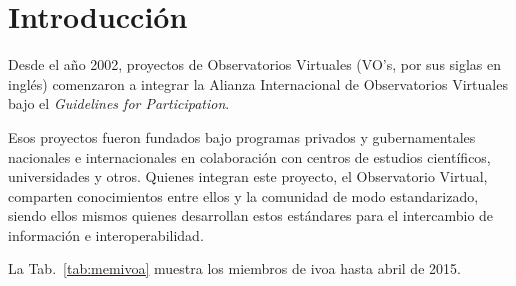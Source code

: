 \section*{Introducción}

Desde el año 2002, proyectos de Observatorios Virtuales (VO’s, por sus siglas en ingl\'es) comenzaron a integrar la Alianza Internacional de Observatorios Virtuales bajo el \emph{Guidelines for Participation}\footnotemark{}.


Esos proyectos fueron fundados bajo programas privados y gubernamentales nacionales e internacionales en colaboración con centros de estudios científicos, universidades y otros. Quienes integran este proyecto, el Observatorio Virtual, comparten conocimientos entre ellos y la comunidad de modo estandarizado, siendo ellos mismos quienes desarrollan estos estándares para el intercambio de información e interoperabilidad.

La Tab.~\ref{tab:memivoa} muestra los miembros de \gls{ivoa} hasta abril de 2015\footnotemark.


